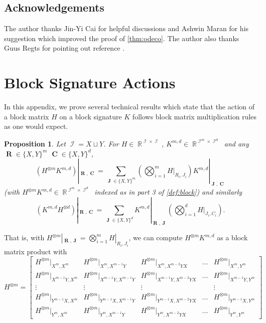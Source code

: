 \documentclass{article}
\newtheorem{proposition}{Proposition}[section]
\theoremstyle{remark}
\theoremstyle{definition}
\DeclareMathOperator{\rr}{\mathbb{R}}
\DeclareMathOperator{\vr}{\mathbf{R}}
\DeclareMathOperator{\vc}{\mathbf{C}}
\DeclareMathOperator{\vj}{\mathbf{J}}
\DeclareMathOperator{\ic}{\mathcal{I}}
\begin{document}
\subsection*{Acknowledgements}
The author thanks Jin-Yi Cai for helpful discussions and Ashwin Maran for his suggestion which
improved the proof of \autoref{thm:odeco}. The author also thanks Guus Regts for pointing out
reference \cite{schrijver_graph_2008}.

\appendix
\section{Block Signature Actions}
\label{sec:appendix_block}
In this appendix, we prove several technical results which state that the action of a 
block matrix $H$ on a block signature $K$ follows block matrix multiplication rules as one would expect.
\begin{proposition}
    \label{prop:block}
    Let $\ic = X \sqcup Y$.
    For $H \in \rr^{\ic\times\ic}$, $K^{m,d} \in \rr^{\ic^m \times \ic^d}$ and any $\vr\in\{X,Y\}^m$
    $\vc\in\{X,Y\}^d$,
    \[
        (H^{\otimes m} K^{m,d})|_{\vr,\vc} = 
        \sum_{\vj \in \{X,Y\}^m} \left(\bigotimes_{i=1}^m H|_{R_i,J_i}\right) K^{m,d}|_{\vj,\vc}
    \]
    (with $H^{\otimes m} K^{m,d} \in \rr^{\ic^m \times \ic^d}$ 
    indexed as in part 3 of \autoref{def:block}) and similarly
    \[
        (K^{m,d}H^{\otimes d})|_{\vr,\vc} = 
        \sum_{\vj \in \{X,Y\}^d}  K^{m,d}|_{\vr,\vj}\left(\bigotimes_{i=1}^d H|_{J_i,C_i}\right).
    \]
\end{proposition}
That is, with $H^{\otimes m}|_{\vr,\vj} = \bigotimes_{i=1}^m H|_{R_i,J_i}$,
we can compute $H^{\otimes m}K^{m,d}$ as a block matrix product with
\[
    H^{\otimes m} = 
    \begin{bmatrix} 
        H^{\otimes m}|_{X^{m},X^{m}} &
        H^{\otimes m}|_{X^{m},X^{m-1}Y} & 
        H^{\otimes m}|_{X^{m},X^{m-2}YX} & \ldots & 
        H^{\otimes m}|_{X^{m},Y^{m}}\\
        H^{\otimes m}|_{X^{m-1}Y,X^{m}} &
        H^{\otimes m}|_{X^{m-1}Y,X^{m-1}Y} & 
        H^{\otimes m}|_{X^{m-1}Y,X^{m-2}YX} & \ldots & 
        H^{\otimes m}|_{X^{m-1}Y,Y^{m}}\\
        \vdots & \vdots & \vdots && \vdots \\
        H^{\otimes m}|_{Y^{m-1}X,X^{m}} & 
        H^{\otimes m}|_{Y^{m-1}X,X^{m-1}Y} &
        H^{\otimes m}|_{Y^{m-1}X,X^{m-2}YX} & \ldots & 
        H^{\otimes m}|_{Y^{m-1}X,Y^{m}}
        \\
        H^{\otimes m}|_{Y^{m},X^{m}} 
        & H^{\otimes m}|_{Y^{m},X^{m-1}Y} 
        & H^{\otimes m}|_{Y^{m},X^{m-2}YX} 
        & \ldots & H^{\otimes m}|_{Y^{m},Y^{m}} 
    \end{bmatrix}
\]
\end{document}
